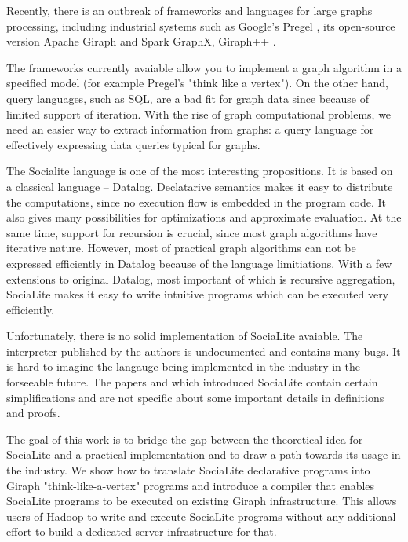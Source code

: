 \documentclass{pracamgr}
\theoremstyle{plain}
\theoremstyle{definition}
\theoremstyle{remark}
\begin{document}
Recently, there is an outbreak of frameworks and languages for large graphs processing, including industrial systems such as Google's Pregel \cite{pregel}, its open-source version Apache Giraph and Spark GraphX, Giraph++ \cite{giraphpp}.

The frameworks currently avaiable allow you to implement a graph algorithm in a specified model (for example Pregel's "think like a vertex"). On the other hand, query languages, such as SQL, are a bad fit for graph data since because of limited support of iteration. With the rise of graph computational problems, we need an easier way to extract information from graphs: a query language for effectively expressing data queries typical for graphs.

The Socialite \cite{socialite} \cite{distsoc} language is one of the most interesting propositions. It is based on a classical language -- Datalog. Declatarive semantics makes it easy to distribute the computations, since no execution flow is embedded in the program code. It also gives many possibilities for optimizations and approximate evaluation. At the same time, support for recursion is crucial, since most graph algorithms have iterative nature. However, most of practical graph algorithms can not be expressed efficiently in Datalog because of the language limitiations. With a few extensions to original Datalog, most important of which is recursive aggregation, SociaLite makes it easy to write intuitive programs which can be executed very efficiently.

Unfortunately, there is no solid implementation of SociaLite avaiable. The interpreter published by the authors is undocumented and contains many bugs. It is hard to imagine the langauge being implemented in the industry in the forseeable future. The papers \cite{socialite} and \cite{distsoc} which introduced SociaLite contain certain simplifications and are not specific about some important details in definitions and proofs.

The goal of this work is to bridge the gap between the theoretical idea for SociaLite and a practical implementation and to draw a path towards its usage in the industry. We show how to translate SociaLite declarative programs into Giraph "think-like-a-vertex" programs and introduce a compiler that enables SociaLite programs to be executed on existing Giraph infrastructure. This allows users of Hadoop to write and execute SociaLite programs without any additional effort to build a dedicated server infrastructure for that.
\end{document}
